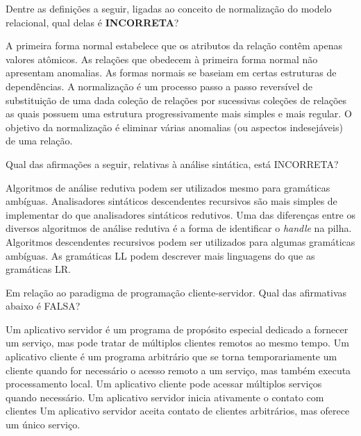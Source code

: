 \documentclass[12pt, addpoints]{exam}
\begin{document}
    \begin{questions}

    \newpage
    \question
Dentre as definições a seguir, ligadas ao conceito de normalização do modelo relacional, qual delas é \textbf{INCORRETA}?

\begin{choices}
\choice A primeira forma normal estabelece que os atributos da relação contêm apenas valores atômicos.
\choice As relações que obedecem à primeira forma normal não apresentam anomalias.
\choice As formas normais se baseiam em certas estruturas de dependências.
\choice A normalização é um processo passo a passo reversível de substituição de uma dada coleção de relações por sucessivas coleções de relações as quais possuem uma estrutura progressivamente mais simples e mais regular.
\choice O objetivo da normalização é eliminar várias anomalias (ou aspectos indesejáveis) de uma relação.
\end{choices}

\question
Qual das afirmações a seguir, relativas à análise sintática, está INCORRETA?

\begin{choices}
\choice Algoritmos de análise redutiva podem ser utilizados mesmo para gramáticas ambíguas.
\choice Analisadores sintáticos descendentes recursivos são mais simples de implementar do que analisadores sintáticos redutivos.
\choice Uma das diferenças entre os diversos algoritmos de análise redutiva é a forma de identificar o \textit{handle} na pilha.
\choice Algoritmos descendentes recursivos podem ser utilizados para algumas gramáticas ambíguas.
\choice As gramáticas LL podem descrever mais linguagens do que as gramáticas LR.
\end{choices}

\question
Em relação ao paradigma de programação cliente-servidor. Qual das afirmativas abaixo é FALSA?
\begin{choices}
\choice Um aplicativo servidor é um programa de propósito especial dedicado a fornecer um serviço, mas pode tratar de múltiplos clientes remotos ao mesmo tempo. 
\choice Um aplicativo cliente é um programa arbitrário que se torna temporariamente um cliente quando for necessário o acesso remoto a um serviço, mas também executa processamento local.
\choice Um aplicativo cliente pode acessar múltiplos serviços quando necessário.
\choice Um aplicativo servidor inicia ativamente o contato com clientes 
\choice Um aplicativo servidor aceita contato de clientes arbitrários, mas oferece um único serviço. 
\end{choices}


\end{questions}
\end{document}
